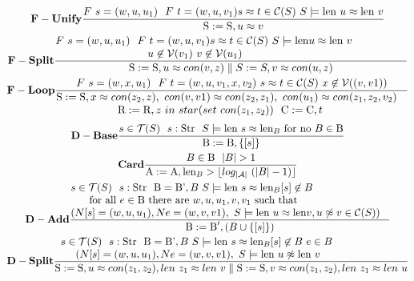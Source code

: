 \documentclass[14pt]{article}
\begin{document}
\begin{gather*}\label{eA1}
 \bold{F-Unify} \frac
 { F \ s = ( w,u,u_1) \ \ F \ t = (w, u,v_1)  s\approx t \in \mathcal{C}(S) \ S \models \textnormal{len} \ u \approx \textnormal{len} \ v }
 { \textnormal{S}:= \textnormal{S}, u \approx v}\\
  \bold{F-Split} \frac
  {\parbox{4.5in}{$  F \ s = ( w,u,u_1) \ \ F \ t = (w, u,v_1)  s\approx t \in \mathcal{C}(S) \ S \models \textnormal{len} u \approx \textnormal{len} \ v  $ \\
       \hspace*{3.0cm}$ u \not\in \mathcal{V}(v_1) \ v \not\in \mathcal{V}(u_1)$}}
  { \textnormal{S}:= \textnormal{S}, u \approx con(v, z) \parallel  S:= S, v \approx con(u, z) }\\
  \bold{F-Loop} \frac
  { F \ s = ( w,x,u_1) \ \ F \ t = (w, u,v_1, x, v_2)  \ s\approx t \in \mathcal{C}(S) \ x \not\in \mathcal{V}((v,v1))}
  { \parbox{4.5in}{$ \textnormal{S}:= \textnormal{S}, x \approx con(z_2, z),\ con(v,v1) \approx con(z_2,z_1),\ con(u_1) \approx con( z_1, z_2,v_2)$ \\
   \hspace*{2.0cm}$  \textnormal{R}:=\textnormal{R}, z \ in \ star(set \ con(z_1, z_2)) \ \ \textnormal{C}:=\textnormal{C}, t $}}
\end{gather*}
\begin{gather*}\label{eA1}
 \bold{D-Base} \frac
 { s \in \mathcal{T}(S) \ \ s: \textnormal{Str}  \ \  S \models \textnormal{len} \ s \approx \textnormal{len}_B \textnormal{ for no }  B \in \textnormal{B} }
 { \textnormal{B}:= \textnormal{B}, \{ [s]\}}\\
  \bold{Card} \frac
  {B \in \textnormal{B} \ \ |B| > 1}
  { \textnormal{A}:= \textnormal{A}, \textnormal{len}_B >  \lfloor  log_{| \mathcal{A}|}  \ ( |B| -1) \rfloor }\\
  \bold{D-Add} \frac
  { \parbox{4.2in}{$s \in \mathcal{T}(S) \ \ s: \textnormal{Str} \ \ \textnormal{B} = \textnormal{B'}, B \   S \models \textnormal{len} \ s \approx \textnormal{len}_B  [s]  \not\in B 
  		$ \\
  		\hspace*{0.5cm}$  		\textnormal{ for all }  e \in \textnormal{B} \textnormal{ there are } w, u,u_1, v,v_1 \textnormal{ such that} 
  		 $ \\
  		 \hspace*{0.0cm}$ (N [s] = (w, u,u_1), N e = (w, v,v1), \ S \models \textnormal{len} \ u \approx \textnormal{len} v, u \not\approx v \in \mathcal{C}(S))$}}
  { \textnormal{B}:= \textnormal{B}', ( B \cup \{ [s]\})}\\
  \bold{D-Split} \frac
  { \parbox{4.5in}{$s \in \mathcal{T}(S) \ \ s: \textnormal{Str} \ \ \textnormal{B} = \textnormal{B'}, B \   S \models \textnormal{len} \ s \approx \textnormal{len}_B  [s]  \not\in B \ e \in B   		 
  		$ \\
  		\hspace*{0.5cm}$ (N [s] = (w, u,u_1), N e = (w, v,v1), \ S \models \textnormal{len} \ u \not\approx \textnormal{len}\ v $}}
  {  \textnormal{S}:=\textnormal{S}, u \approx con(z_1, z_2), len \ z_1 \approx len \ v  \parallel  \textnormal{S}:=\textnormal{S}, v \approx con(z_1, z_2), len \ z_1 \approx len \ u}
  \end{gather*}
\end{document}
